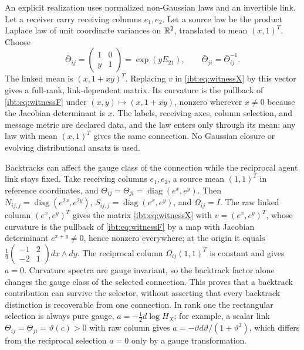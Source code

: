 An explicit realization uses normalized non-Gaussian laws and an invertible link. Let a receiver carry receiving columns $e_1,e_2$. Let a source law be the product Laplace law of unit coordinate variances on $\mathbb R^2$, translated to mean $(x,1)^T$. Choose
\begin{equation}
 \bar\Theta_{ij}=\begin{pmatrix}1&0\\y&1\end{pmatrix}
        =\exp(yE_{21}),\qquad \bar\Theta_{ji}=\bar\Theta_{ij}^{-1}.
\end{equation}
The linked mean is $(x,1+xy)^T$. Replacing $v$ in \cref{ibt:eq:witnessX} by this vector gives a full-rank, link-dependent matrix. Its curvature is the pullback of \cref{ibt:eq:witnessF} under $(x,y)\mapsto(x,1+xy)$, nonzero wherever $x\ne0$ because the Jacobian determinant is $x$. The labels, receiving axes, column selection, and message metric are declared data, and the law enters only through its mean: any law with mean $(x,1)^T$ gives the same connection. No Gaussian closure or evolving distributional ansatz is used.

Backtracks can affect the gauge class of the connection while the reciprocal agent link stays fixed. Take receiving columns $e_1,e_2$, a source mean $(1,1)^T$ in reference coordinates, and $\Theta_{ij}=\Theta_{ji}=\operatorname{diag}(e^x,e^y)$. Then $N_{ij,j}=\operatorname{diag}(e^{2x},e^{2y})$, $S_{ij,j}=\operatorname{diag}(e^x,e^y)$, and $\Omega_{ij}=I$. The raw linked column $(e^x,e^y)^T$ gives the matrix \cref{ibt:eq:witnessX} with $v=(e^x,e^y)^T$, whose curvature is the pullback of \cref{ibt:eq:witnessF} by a map with Jacobian determinant $e^{x+y}\neq0$, hence nonzero everywhere; at the origin it equals $\frac19\begin{pmatrix}-1&2\\-2&1\end{pmatrix}dx\wedge dy$. The reciprocal column $\Omega_{ij}(1,1)^T$ is constant and gives $a=0$. Curvature spectra are gauge invariant, so the backtrack factor alone changes the gauge class of the selected connection. This proves that a backtrack contribution can survive the selector, without asserting that every backtrack distinction is recoverable from one connection. In rank one the rectangular selection is always pure gauge, $a=-\tfrac12d\log H_X$; for example, a scalar link $\Theta_{ij}=\Theta_{ji}=\vartheta(c)>0$ with raw column gives $a=-\vartheta d\vartheta/(1+\vartheta^2)$, which differs from the reciprocal selection $a=0$ only by a gauge transformation.

